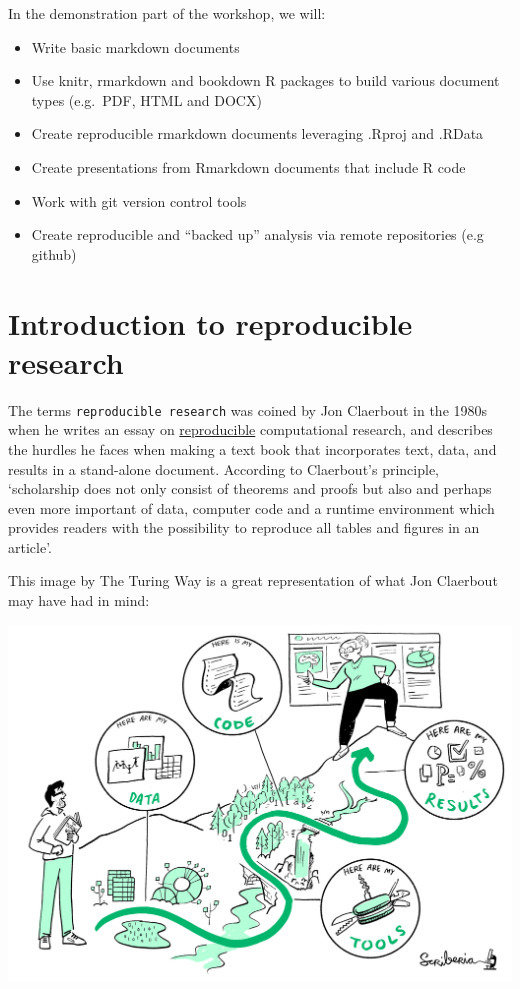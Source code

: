 \documentclass[
  12pt,
]{book}
\providecommand{\tightlist}{%
  \setlength{\itemsep}{0pt}\setlength{\parskip}{0pt}}
\begin{document}
In the demonstration part of the workshop, we will:

\begin{itemize}
\tightlist
\item
  Write basic markdown documents\\
\item
  Use knitr, rmarkdown and bookdown R packages to build various document types (e.g.~PDF, HTML and DOCX)\\
\item
  Create reproducible rmarkdown documents leveraging .Rproj and .RData\\
\item
  Create presentations from Rmarkdown documents that include R code\\
\item
  Work with git version control tools\\
\item
  Create reproducible and ``backed up'' analysis via remote repositories (e.g github)
\end{itemize}

\hypertarget{introduction-to-reproducible-research}{%
\chapter{Introduction to reproducible research}\label{introduction-to-reproducible-research}}

The terms \texttt{reproducible\ research} was coined by Jon Claerbout in the 1980s when he writes an essay on \href{http://sepwww.stanford.edu/sep/jon/reproducible.html}{reproducible} computational research, and describes the hurdles he faces when making a text book that incorporates text, data, and results in a stand-alone document. According to Claerbout's principle, `scholarship does not only consist of theorems and proofs but also and perhaps even more important of data, computer code and a runtime environment which provides readers with the possibility to reproduce all tables and figures in an article'.

This image by The Turing Way is a great representation of what Jon Claerbout may have had in mind:

\includegraphics{rr-presentation-figure/ReproducibleJourney.jpg}
\end{document}
